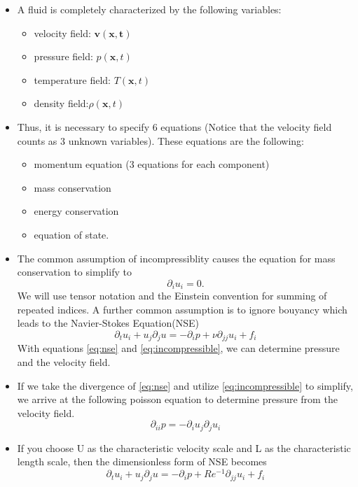 \documentclass[11pt]{article}
\begin{document}
\begin{itemize}
\item A fluid is completely characterized by the following variables:
	\begin{itemize}
		\item velocity field: $\mathbf{v(\mathbf{x},t)}$
		\item pressure field: $p(\mathbf{x},t)$
		\item temperature field: $T(\mathbf{x},t)$
		\item density field:$\rho (\mathbf{x},t)$
	\end{itemize}
\item Thus, it is necessary to specify 6 equations (Notice that the velocity field counts as 3 unknown variables). These equations are the following:
	\begin{itemize}
		\item momentum equation (3 equations for each component)
		\item mass conservation
		\item energy conservation
		\item equation of state.
	\end{itemize}
\item The common assumption of incompressiblity causes the equation for mass conservation to simplify to 
\begin{equation}
\label{eq:incompressible}
\partial_{i}u_{i}=0.
\end{equation}
We will use tensor notation and the Einstein convention for summing of repeated indices. A further common assumption is to ignore bouyancy which leads to the Navier-Stokes Equation(NSE)
\begin{equation}
\label{eq:nse}
\partial_{t}u_{i}+u_{j}\partial_{j}u = -\partial_{i}p+\nu\partial_{jj}u_{i}+f_{i}
\end{equation}
With equations \ref{eq:nse} and  \ref{eq:incompressible}, we can determine pressure and the velocity field. 
\item If we take the divergence of \ref{eq:nse} and utilize \ref{eq:incompressible} to simplify, we arrive at the following poisson equation to determine pressure from the velocity field. 
\[\partial_{ii}p=-\partial_{i}u_{j}\partial_{j}u_{i}\]
\item If you choose U as the characteristic velocity scale and L as the characteristic length scale, then the dimensionless form of NSE becomes 
\begin{equation}
\label{eq:nse-dless}
\partial_{t}u_{i}+u_{j}\partial_{j}u = -\partial_{i}p+ Re^{-1}\partial_{jj}u_{i}+f_{i}

\end{equation}
\end{itemize}
\end{document}
